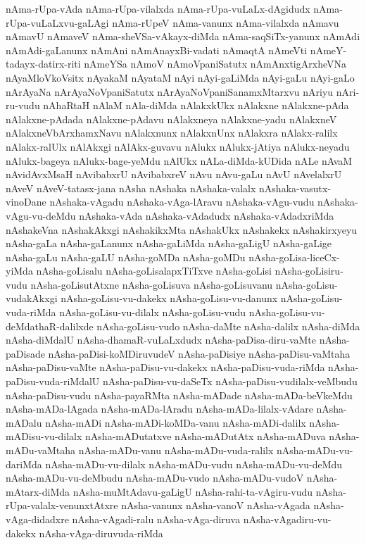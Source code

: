 {nAma-rUpa-vAda
nAma-rUpa-vilalxda
nAma-rUpa-vuLaLx-dAgidudx
nAma-rUpa-vuLaLxvu-gaLAgi
nAma-rUpeV
nAma-vanunx
nAma-vilalxda
nAmavu
nAmavU
nAmaveV
nAma-sheVSa-vAkayx-diMda
nAma-saqSiTx-yanunx
nAmAdi
nAmAdi-gaLanunx
nAmAni
nAmAnayxBi-vadati
nAmaqtA
nAmeVti
nAmeY-tadayx-datirx-riti
nAmeYSa
nAmoV
nAmoVpaniSatutx
nAmAnxtigArxheVNa
nAyaMloVkoVsitx
nAyakaM
nAyataM
nAyi
nAyi-gaLiMda
nAyi-gaLu
nAyi-gaLo
nArAyaNa
nArAyaNoVpaniSatutx
nArAyaNoVpaniSanamxMtarxvu
nAriyu
nAri-ru-vudu
nAhaRtaH
nAlaM
nAla-diMda
nAlakxkUkx
nAlakxne
nAlakxne-pAda
nAlakxne-pAdada
nAlakxne-pAdavu
nAlakxneya
nAlakxne-yadu
nAlakxneV
nAlakxneVbArxhamxNavu
nAlakxnunx
nAlakxnUnx
nAlakxra
nAlakx-ralilx
nAlakx-ralUlx
nAlAkxgi
nAlAkx-guvavu
nAlukx
nAlukx-jAtiya
nAlukx-neyadu
nAlukx-bageya
nAlukx-bage-yeMdu
nAlUkx
nALa-diMda-kUDida
nALe
nAvaM
nAvidAvxMsaH
nAvibabxrU
nAvibabxreV
nAvu
nAvu-gaLu
nAvU
nAvelalxrU
nAveV
nAveV-tatasx-jana
nAsha
nAshaka
nAshaka-valalx
nAshaka-vasutx-vinoDane
nAshaka-vAgadu
nAshaka-vAga-lAravu
nAshaka-vAgu-vudu
nAshaka-vAgu-vu-deMdu
nAshaka-vAda
nAshaka-vAdadudx
nAshaka-vAdadxriMda
nAshakeVna
nAshakAkxgi
nAshakikxMta
nAshakUkx
nAshakekx
nAshakirxyeyu
nAsha-gaLa
nAsha-gaLanunx
nAsha-gaLiMda
nAsha-gaLigU
nAsha-gaLige
nAsha-gaLu
nAsha-gaLU
nAsha-goMDa
nAsha-goMDu
nAsha-goLisa-liceCx-yiMda
nAsha-goLisalu
nAsha-goLisalapxTiTxve
nAsha-goLisi
nAsha-goLisiru-vudu
nAsha-goLisutAtxne
nAsha-goLisuva
nAsha-goLisuvanu
nAsha-goLisu-vudakAkxgi
nAsha-goLisu-vu-dakekx
nAsha-goLisu-vu-danunx
nAsha-goLisu-vuda-riMda
nAsha-goLisu-vu-dilalx
nAsha-goLisu-vudu
nAsha-goLisu-vu-deMdathaR-dalilxde
nAsha-goLisu-vudo
nAsha-daMte
nAsha-dalilx
nAsha-diMda
nAsha-diMdalU
nAsha-dhamaR-vuLaLxdudx
nAsha-paDisa-diru-vaMte
nAsha-paDisade
nAsha-paDisi-koMDiruvudeV
nAsha-paDisiye
nAsha-paDisu-vaMtaha
nAsha-paDisu-vaMte
nAsha-paDisu-vu-dakekx
nAsha-paDisu-vuda-riMda
nAsha-paDisu-vuda-riMdalU
nAsha-paDisu-vu-daSeTx
nAsha-paDisu-vudilalx-veMbudu
nAsha-paDisu-vudu
nAsha-payaRMta
nAsha-mADade
nAsha-mADa-beVkeMdu
nAsha-mADa-lAgada
nAsha-mADa-lAradu
nAsha-mADa-lilalx-vAdare
nAsha-mADalu
nAsha-mADi
nAsha-mADi-koMDa-vanu
nAsha-mADi-dalilx
nAsha-mADisu-vu-dilalx
nAsha-mADutatxve
nAsha-mADutAtx
nAsha-mADuva
nAsha-mADu-vaMtaha
nAsha-mADu-vanu
nAsha-mADu-vuda-ralilx
nAsha-mADu-vu-dariMda
nAsha-mADu-vu-dilalx
nAsha-mADu-vudu
nAsha-mADu-vu-deMdu
nAsha-mADu-vu-deMbudu
nAsha-mADu-vudo
nAsha-mADu-vudoV
nAsha-mAtarx-diMda
nAsha-muMtAdavu-gaLigU
nAsha-rahi-ta-vAgiru-vudu
nAsha-rUpa-valalx-venunxtAtxre
nAsha-vanunx
nAsha-vanoV
nAsha-vAgada
nAsha-vAga-didadxre
nAsha-vAgadi-ralu
nAsha-vAga-diruva
nAsha-vAgadiru-vu-dakekx
nAsha-vAga-diruvuda-riMda
}
